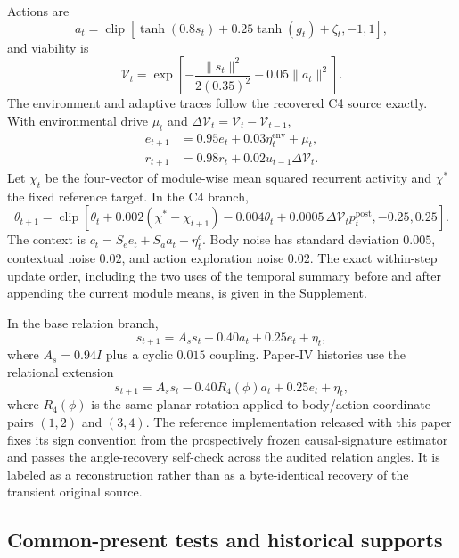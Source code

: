 \documentclass[aps,pre,preprint,superscriptaddress,nofootinbib]{revtex4-2}
\newcommand{\Vcal}{\mathcal{V}}
\begin{document}
Actions are
\begin{equation}
 a_t=\operatorname{clip}\left[\tanh(0.8s_t)+0.25\tanh(g_t)+\zeta_t,-1,1\right],
\end{equation}
and viability is
\begin{equation}
 \Vcal_t=\exp\left[-\frac{\|s_t\|^2}{2(0.35)^2}-0.05\|a_t\|^2\right].
\end{equation}
The environment and adaptive traces follow the recovered C4 source exactly. With environmental drive $\mu_t$ and $\Delta\Vcal_t=\Vcal_t-\Vcal_{t-1}$,
\begin{align}
 e_{t+1} &=0.95e_t+0.03\eta^{\mathrm{env}}_t+\mu_t,\\
 r_{t+1} &=0.98r_t+0.02u_{t-1}\Delta\Vcal_t.
\end{align}
Let $\chi_t$ be the four-vector of module-wise mean squared recurrent activity and $\chi^*$ the fixed reference target. In the C4 branch,
\begin{equation}
 \theta_{t+1}=\operatorname{clip}\!\left[\theta_t+0.002(\chi^*-\chi_{t+1})-0.004\theta_t+0.0005\,\Delta\Vcal_t p_t^{\mathrm{post}},-0.25,0.25\right].
\end{equation}
The context is $c_t=S_ee_t+S_aa_t+\eta^{c}_t$. Body noise has standard deviation $0.005$, contextual noise $0.02$, and action exploration noise $0.02$. The exact within-step update order, including the two uses of the temporal summary before and after appending the current module means, is given in the Supplement.

In the base relation branch,
\begin{equation}
 s_{t+1}=A_ss_t-0.40a_t+0.25e_t+\eta_t,
\end{equation}
where $A_s=0.94I$ plus a cyclic $0.015$ coupling. Paper-IV histories use the relational extension
\begin{equation}
 s_{t+1}=A_ss_t-0.40R_4(\phi)a_t+0.25e_t+\eta_t,
\end{equation}
where $R_4(\phi)$ is the same planar rotation applied to body/action coordinate pairs $(1,2)$ and $(3,4)$. The reference implementation released with this paper fixes its sign convention from the prospectively frozen causal-signature estimator and passes the angle-recovery self-check across the audited relation angles. It is labeled as a reconstruction rather than as a byte-identical recovery of the transient original source.

\subsection{Common-present tests and historical supports}
\end{document}
